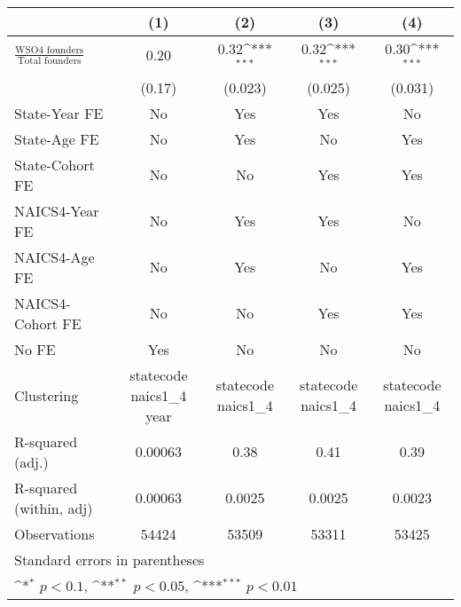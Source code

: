 {
\def\sym#1{\ifmmode^{#1}\else\(^{#1}\)\fi}
\begin{tabular}{l*{4}{c}}
\toprule
                    &\multicolumn{1}{c}{(1)}         &\multicolumn{1}{c}{(2)}         &\multicolumn{1}{c}{(3)}         &\multicolumn{1}{c}{(4)}         \\
\midrule
$\frac{\text{WSO4 founders}}{\text{Total founders}}$&        0.20         &        0.32\sym{***}&        0.32\sym{***}&        0.30\sym{***}\\
                    &      (0.17)         &     (0.023)         &     (0.025)         &     (0.031)         \\
\addlinespace
State-Year FE       &          No         &         Yes         &         Yes         &          No         \\
\addlinespace
State-Age FE        &          No         &         Yes         &          No         &         Yes         \\
\addlinespace
State-Cohort FE     &          No         &          No         &         Yes         &         Yes         \\
\addlinespace
NAICS4-Year FE      &          No         &         Yes         &         Yes         &          No         \\
\addlinespace
NAICS4-Age FE       &          No         &         Yes         &          No         &         Yes         \\
\addlinespace
NAICS4-Cohort FE    &          No         &          No         &         Yes         &         Yes         \\
\addlinespace
No FE               &         Yes         &          No         &          No         &          No         \\
\midrule
Clustering          &statecode naics1\_4 year         &statecode naics1\_4         &statecode naics1\_4         &statecode naics1\_4         \\
R-squared (adj.)    &     0.00063         &        0.38         &        0.41         &        0.39         \\
R-squared (within, adj)&     0.00063         &      0.0025         &      0.0025         &      0.0023         \\
Observations        &       54424         &       53509         &       53311         &       53425         \\
\bottomrule
\multicolumn{5}{l}{\footnotesize Standard errors in parentheses}\\
\multicolumn{5}{l}{\footnotesize \sym{*} \(p<0.1\), \sym{**} \(p<0.05\), \sym{***} \(p<0.01\)}\\
\end{tabular}
}
